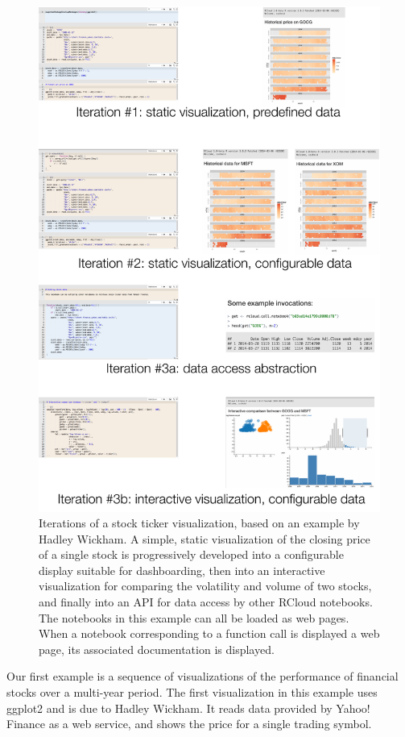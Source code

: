 \begin{figure}[b]
\includegraphics[width=\linewidth]{fig/casestudy1/casestudy1.pdf}
\caption{\label{fig:stockvis}Iterations of a stock ticker
  visualization, based on an example by Hadley Wickham. A
  simple, static visualization of the closing price of a single stock
  is progressively developed into a configurable display suitable
  for dashboarding, then into an interactive visualization for 
  comparing the volatility and volume of two stocks, and finally
  into an API for data access by other RCloud notebooks. The notebooks
  in this example can all be loaded as web pages. When a notebook
  corresponding to a function call is displayed a web page,
  its associated documentation is displayed.}
\end{figure}

Our first example is a sequence of visualizations of the performance
of financial stocks over a multi-year period. The first visualization
in this example uses ggplot2 and is due to Hadley Wickham. It reads
data provided by Yahoo! Finance as a web service, and shows the price
for a single trading symbol.

